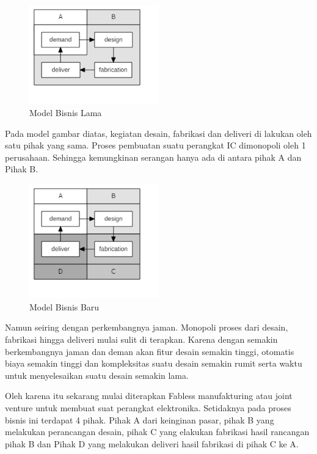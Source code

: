 \begin{figure}
	\centering
	\includegraphics[width=0.5\textwidth]
	{diagrams/oldBusinessLSI.png}
	\caption{Model Bisnis Lama}
	\label{fig:oldbiss}
\end{figure}

Pada model gambar diatas, kegiatan desain, fabrikasi dan deliveri di lakukan oleh satu pihak yang sama. Proses pembuatan suatu perangkat IC dimonopoli oleh 1 perusahaan. Sehingga kemungkinan serangan hanya ada di antara pihak A dan Pihak B.

\begin{figure}
	\centering
	\includegraphics[width=0.5\textwidth]
	{diagrams/newBusinessLSI.png}
	\caption{Model Bisnis Baru}
	\label{fig:newbiss}
\end{figure}

Namun seiring dengan perkembangnya jaman. Monopoli proses dari desain, fabrikasi hingga deliveri mulai sulit di terapkan. Karena dengan semakin berkembangnya jaman dan deman akan fitur desain semakin tinggi, otomatis biaya semakin tinggi dan kompleksitas suatu desain semakin rumit serta waktu untuk menyelesaikan suatu desain semakin lama.

Oleh karena itu sekarang mulai diterapkan Fabless manufakturing atau joint venture untuk membuat suat perangkat elektronika. Setidaknya pada proses bisnis ini terdapat 4 pihak. Pihak A dari keinginan pasar, pihak B yang melakukan perancangan desain, pihak C yang elakukan fabrikasi hasil rancangan pihak B dan Pihak D yang melakukan deliveri hasil fabrikasi di pihak C ke A.

